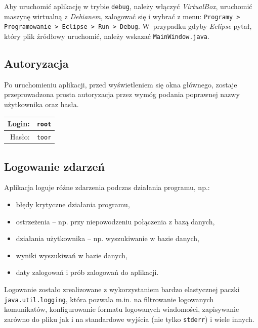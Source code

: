 \documentclass[a4paper,titlepage]{article}
\theoremstyle{break}
\numberwithin{equation}{subsection}
\begin{document}
Aby uruchomić aplikację w trybie \texttt{debug}, należy włączyć \emph{VirtualBox}, uruchomić maszynę wirtualną z \emph{Debianem}, zalogować się i wybrać z menu: \texttt{Programy > Programowanie > Eclipse > Run > Debug}. W~przypadku gdyby \emph{Eclipse} pytał, który plik źródłowy uruchomić, należy wskazać \texttt{MainWindow.java}.


\subsection{Autoryzacja}
\label{sec:autoryzacja}

Po uruchomieniu aplikacji, przed wyświetleniem się okna głównego, zostaje przeprowadzona prosta autoryzacja przez wymóg podania poprawnej nazwy użytkownika oraz hasła.

\begin{tabular}{r|l}
Login: & \texttt{root}\\
\hline
Hasło: & \texttt{toor}\\
\end{tabular}


\subsection{Logowanie zdarzeń}
\label{sec:logowanie}

Aplikacja loguje różne zdarzenia podczas działania programu, np.:
\begin{itemize}
	\item błędy krytyczne działania programu,
	\item ostrzeżenia -- np. przy niepowodzeniu połączenia z bazą danych,
	\item działania użytkownika -- np. wyszukiwanie w bazie danych,
	\item wyniki wyszukiwań w bazie danych,
	\item daty zalogowań i prób zalogowań do aplikacji.
\end{itemize}
Logowanie zostało zrealizowane z wykorzystaniem bardzo elastycznej paczki \texttt{java.util.logging}, która pozwala m.in. na filtrowanie logowanych komunikatów, konfigurowanie formatu logowanych wiadomości, zapisywanie zarówno do pliku jak i na standardowe wyjścia (nie tylko \texttt{stderr}) i wiele innych.
\end{document}
